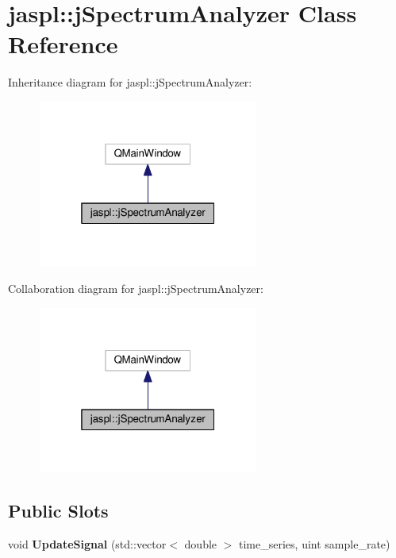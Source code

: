 \hypertarget{classjaspl_1_1j_spectrum_analyzer}{}\section{jaspl\+:\+:j\+Spectrum\+Analyzer Class Reference}
\label{classjaspl_1_1j_spectrum_analyzer}


Inheritance diagram for jaspl\+:\+:j\+Spectrum\+Analyzer\+:
\nopagebreak
\begin{figure}[H]
\begin{center}
\leavevmode
\includegraphics[width=205pt]{classjaspl_1_1j_spectrum_analyzer__inherit__graph}
\end{center}
\end{figure}


Collaboration diagram for jaspl\+:\+:j\+Spectrum\+Analyzer\+:
\nopagebreak
\begin{figure}[H]
\begin{center}
\leavevmode
\includegraphics[width=205pt]{classjaspl_1_1j_spectrum_analyzer__coll__graph}
\end{center}
\end{figure}
\subsection*{Public Slots}
\begin{DoxyCompactItemize}
\item 
void {\bfseries Update\+Signal} (std\+::vector$<$ double $>$ time\+\_\+series, uint sample\+\_\+rate)\hypertarget{classjaspl_1_1j_spectrum_analyzer_a0724baa59176c7e8a0050f52472f578f}{}\label{classjaspl_1_1j_spectrum_analyzer_a0724baa59176c7e8a0050f52472f578f}

\end{DoxyCompactItemize}
